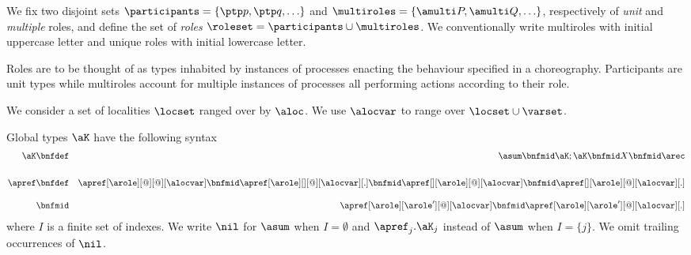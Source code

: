 
We fix two disjoint sets $\participants = \{\ptp p, \ptp q, \ldots\}$
and $\multiroles = \{\amulti P, \amulti Q, \ldots \}$, respectively of
\emph{unit} and \emph{multiple} roles, and define the set of
\emph{roles} $\roleset = \participants \cup \multiroles$.
%
We conventionally write multiroles with initial uppercase letter and
unique roles with initial lowercase letter.
%

Roles are to be thought of as types inhabited by instances of
processes enacting the behaviour specified in a choreography.
%
Participants are unit types while multiroles account for multiple
instances of processes all performing actions according to their role.

We consider a set of localities $\locset$ ranged over by $\aloc$. We use 
$\alocvar$ to range over $\locset\cup\varset$.

Global types $\aK$ have the following syntax
\begin{eqnarray*}
  \aK & \bnfdef & \asum \bnfmid
	    	 \aK; \aK \bnfmid
                  X \bnfmid
                  \arec
  \\[1.5em]
  \apref & \bnfdef & \apref[\arole][@][@][\alocvar] \bnfmid
                     \apref[\arole][{}][@][\alocvar][.] \bnfmid
                     \apref[{}][\arole][@][\alocvar] \bnfmid
                     \apref[{}][\arole][@][\alocvar][.]
  \\[1em]
        & \bnfmid & \apref[\arole][\arole'][@][\alocvar] \bnfmid
                    \apref[\arole][\arole'][@][\alocvar][.]
\end{eqnarray*}
where $I$ is a finite set of indexes.
%
We write $\nil$ for $\asum$ when $I = \emptyset$ and
$\apref_j.\aK_j$ instead of $\asum$ when $I = \{j\}$.
%
We omit trailing occurrences of $\nil$.

